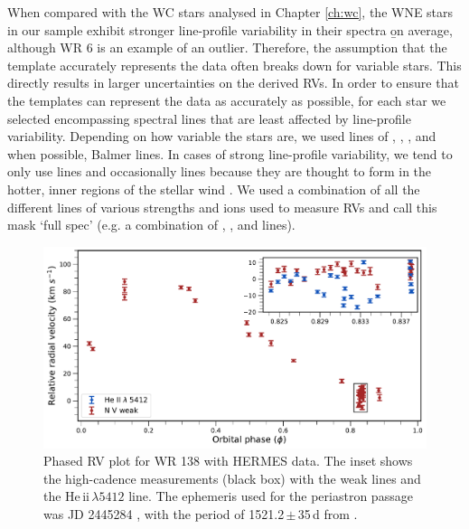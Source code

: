 When compared with the WC stars analysed in Chapter \ref{ch:wc}, the WNE stars in our sample exhibit stronger line-profile variability in their spectra \b{on average, although WR 6 is an example of an outlier}. Therefore, the assumption that the template accurately represents the data often breaks down for variable stars. This directly results in larger uncertainties on the derived RVs. In order to ensure that the templates can represent the data as accurately as possible, for each star we selected encompassing spectral lines that are least affected by line-profile variability. Depending on how variable the stars are, we used lines of \niv, \nv, \heii,{} and when possible, Balmer lines. In cases of strong line-profile variability, we tend to only use \nv{} lines and occasionally \niv{} lines because they are thought to form in the hotter, inner regions of the stellar wind \citep[see, e.g.][]{1987Hillier_WN,1988Hillier}. We used a combination of all the different lines of various strengths and ions used to measure RVs and call this mask `full spec' (e.g. a combination of \nv{}, \niv,{} and \heii{} lines).

\begin{figure}
    \centering
    \includegraphics[width=\textwidth]{chapters/WNE/image/WR138_nogrid.pdf}
    \caption{Phased RV plot for WR 138 with HERMES data. The inset shows the high-cadence measurements (black box) with the \nv{} weak lines and the He\,{\sc ii}\,$\lambda 5412$ line. The ephemeris used for the periastron passage was JD 2445284 \citep{1990Annuk}, with the period of 1521.2\,$\pm$\,35\,d from \citet{2013Palate}.}
    \label{fig:WR138_phased}
\end{figure}

